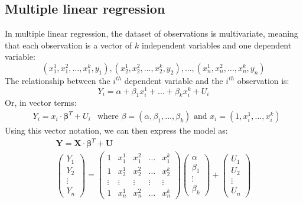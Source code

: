 \subsection{Multiple linear regression}
In multiple linear regression, the dataset of observations is multivariate, meaning that each observation is a vector of $k$ independent variables and one dependent variable:
\begin{equation*}
    (x_1^1, x_1^2, \ldots, x_1^k, y_1), (x_2^1, x_2^2, \ldots, x_2^k, y_2), \ldots, (x_n^1, x_n^2, \ldots, x_n^k, y_n)
\end{equation*}   
The relationship between the $i^{th}$ dependent variable and the $i^{th}$ observation is:
\begin{equation*}
    Y_i = \alpha + \beta_1 x_i^1 + \ldots + \beta_k x_i^k + U_i
\end{equation*}   
Or, in vector terms:
\begin{align*}
    &Y_i = x_i \cdot \boldsymbol{\beta}^T + U_i &\text{where } \beta = (\alpha, \beta_1, \ldots, \beta_k) \text{ and } x_i = (1, x_i^1, \ldots, x_i^k)
\end{align*}
Using this vector notation, we can then express the model as:
\begin{gather*}
    \mathbf{Y} = \mathbf{X} \cdot \boldsymbol{\beta}^T + \mathbf{U} \\
    \begin{pmatrix}
        Y_1 \\
        Y_2 \\
        \vdots \\
        Y_n
    \end{pmatrix} =
    \begin{pmatrix}
        1 & x_1^1 & x_1^2 & \dots & x_1^k \\
        1 & x_2^1 & x_2^2 & \dots & x_2^k \\
        \vdots & \vdots & \vdots & \vdots & \vdots \\
        1 & x_n^1 & x_n^2 & \dots & x_n^k
    \end{pmatrix}
    \begin{pmatrix}
        \alpha \\
        \beta_1 \\
        \vdots \\
        \beta_k
    \end{pmatrix} +
    \begin{pmatrix}
        U_1 \\
        U_2 \\
        \vdots \\
        U_n
    \end{pmatrix}
\end{gather*}
